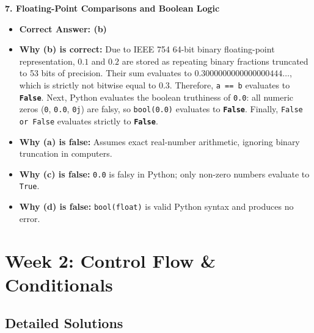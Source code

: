 \textbf{7. Floating-Point Comparisons and Boolean Logic}
\begin{itemize}
    \item \textbf{Correct Answer: (b)}
    \item \textbf{Why (b) is correct:}
    Due to IEEE 754 64-bit binary floating-point representation, $0.1$ and $0.2$ are stored as repeating binary fractions truncated to 53 bits of precision. Their sum evaluates to $0.3000000000000000444\dots$, which is strictly not bitwise equal to $0.3$.
    Therefore, \texttt{a == b} evaluates to \textbf{\texttt{False}}.
    Next, Python evaluates the boolean truthiness of \texttt{0.0}: all numeric zeros (\texttt{0}, \texttt{0.0}, \texttt{0j}) are falsy, so \texttt{bool(0.0)} evaluates to \textbf{\texttt{False}}.
    Finally, \texttt{False or False} evaluates strictly to \textbf{\texttt{False}}.
    \item \textbf{Why (a) is false:} Assumes exact real-number arithmetic, ignoring binary truncation in computers.
    \item \textbf{Why (c) is false:} \texttt{0.0} is falsy in Python; only non-zero numbers evaluate to \texttt{True}.
    \item \textbf{Why (d) is false:} \texttt{bool(float)} is valid Python syntax and produces no error.
\end{itemize}

\section*{Week 2: Control Flow \& Conditionals}

\subsection*{Detailed Solutions}

